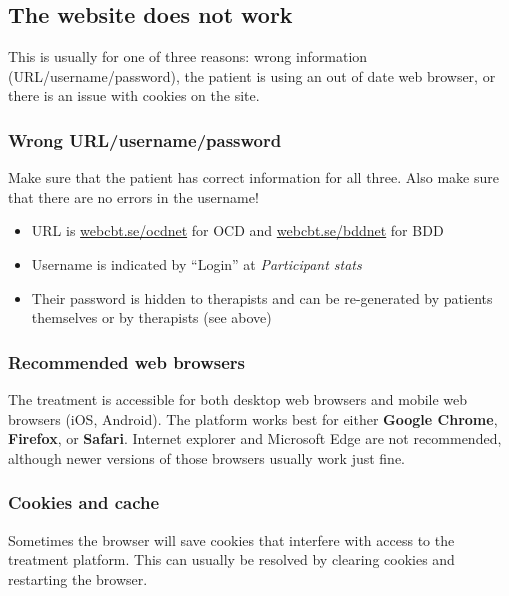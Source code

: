 \documentclass[]{book}
\providecommand{\tightlist}{%
  \setlength{\itemsep}{0pt}\setlength{\parskip}{0pt}}
\theoremstyle{definition}
\theoremstyle{definition}
\theoremstyle{definition}
\theoremstyle{remark}
\begin{document}
\hypertarget{the-website-does-not-work}{%
\subsection{The website does not work}\label{the-website-does-not-work}}

This is usually for one of three reasons: wrong information
(URL/username/password), the patient is using an out of date web
browser, or there is an issue with cookies on the site.

\hypertarget{wrong-urlusernamepassword}{%
\subsubsection{Wrong
URL/username/password}\label{wrong-urlusernamepassword}}

Make sure that the patient has correct information for all three. Also
make sure that there are no errors in the username!

\begin{itemize}
\tightlist
\item
  URL is \url{webcbt.se/ocdnet} for OCD and \url{webcbt.se/bddnet} for
  BDD
\item
  Username is indicated by ``Login'' at \emph{Participant stats}
\item
  Their password is hidden to therapists and can be re-generated by
  patients themselves or by therapists (see above)
\end{itemize}

\hypertarget{recommended-web-browsers}{%
\subsubsection{Recommended web
browsers}\label{recommended-web-browsers}}

The treatment is accessible for both desktop web browsers and mobile web
browsers (iOS, Android). The platform works best for either
\textbf{Google Chrome}, \textbf{Firefox}, or \textbf{Safari}. Internet
explorer and Microsoft Edge are not recommended, although newer versions
of those browsers usually work just fine.

\hypertarget{cookies-and-cache}{%
\subsubsection{Cookies and cache}\label{cookies-and-cache}}

Sometimes the browser will save cookies that interfere with access to
the treatment platform. This can usually be resolved by clearing cookies
and restarting the browser.
\end{document}
